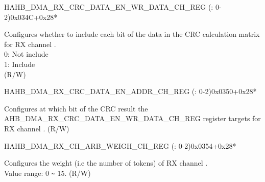 \begin{register}{H}{AHB\_DMA\_RX\_CRC\_DATA\_EN\_WR\_DATA\_CH\_REG (: 0-2)}{0x034C+0x28*}\label{regdesc:AHBDMARXCRCDATAENWRDATACHNREG}
%
%
\regnewline%
\begin{regdesc}\begin{reglist}
\label{fielddesc:AHBDMARXCRCDATAENWRDATACHN}\item [AHB\_DMA\_RX\_CRC\_DATA\_EN\_WR\_DATA\_CH\regindex{n}] Configures whether to include each bit of the data in the CRC calculation matrix for RX channel .\\
0: Not include\\
1: Include\\ (R/W)
\end{reglist}\end{regdesc}
\end{register}


\begin{register}{H}{AHB\_DMA\_RX\_CRC\_DATA\_EN\_ADDR\_CH\_REG (: 0-2)}{0x0350+0x28*}\label{regdesc:AHBDMARXCRCDATAENADDRCHNREG}
%
\regnewline%
\begin{regdesc}\begin{reglist}
\label{fielddesc:AHBDMARXCRCDATAENADDRCHN}\item [AHB\_DMA\_RX\_CRC\_DATA\_EN\_ADDR\_CH\regindex{n}] Configures at which bit of the CRC result the AHB\_DMA\_RX\_CRC\_DATA\_EN\_WR\_DATA\_CH\_REG register targets for RX channel . (R/W)
\end{reglist}\end{regdesc}
\end{register}


\begin{register}{H}{AHB\_DMA\_RX\_CH\_ARB\_WEIGH\_CH\_REG (: 0-2)}{0x0354+0x28*}\label{regdesc:AHBDMARXCHARBWEIGHCHNREG}
%
%
\regnewline%
\begin{regdesc}\begin{reglist}
\label{fielddesc:AHBDMARXCHARBWEIGHCHN}\item [AHB\_DMA\_RX\_CH\_ARB\_WEIGH\_CH\regindex{n}] Configures the weight (i.e the number of tokens) of RX channel .\\
Value range: 0 \verb+~+ 15. (R/W)
\end{reglist}\end{regdesc}
\end{register}



